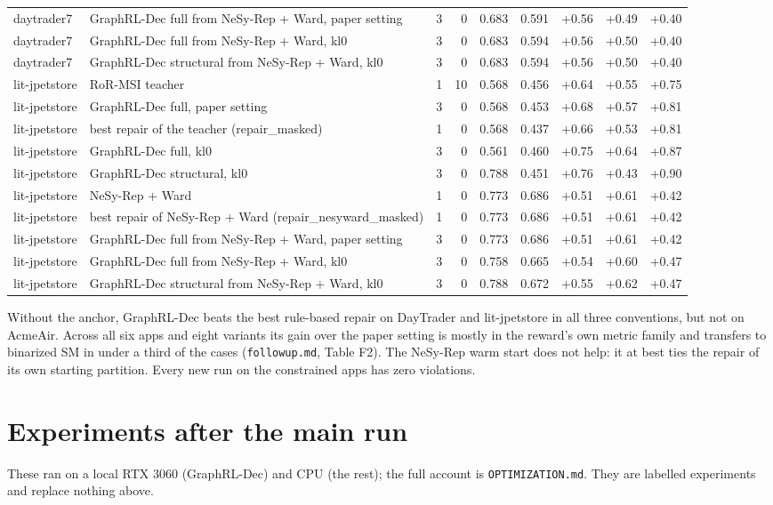 \documentclass[10pt,a4paper]{article}
\begin{document}
\begin{center}
{\begin{tabular}{llrrrrrrr}
daytrader7 & GraphRL-Dec full from NeSy-Rep + Ward, paper setting & 3 & 0 & 0.683 & 0.591 & +0.56 & +0.49 & +0.40 \\
daytrader7 & GraphRL-Dec full from NeSy-Rep + Ward, kl0 & 3 & 0 & 0.683 & 0.594 & +0.56 & +0.50 & +0.40 \\
daytrader7 & GraphRL-Dec structural from NeSy-Rep + Ward, kl0 & 3 & 0 & 0.683 & 0.594 & +0.56 & +0.50 & +0.40 \\
lit-jpetstore & RoR-MSI teacher & 1 & 10 & 0.568 & 0.456 & +0.64 & +0.55 & +0.75 \\
lit-jpetstore & GraphRL-Dec full, paper setting & 3 & 0 & 0.568 & 0.453 & +0.68 & +0.57 & +0.81 \\
lit-jpetstore & best repair of the teacher (repair\_masked) & 1 & 0 & 0.568 & 0.437 & +0.66 & +0.53 & +0.81 \\
lit-jpetstore & GraphRL-Dec full, kl0 & 3 & 0 & 0.561 & 0.460 & +0.75 & +0.64 & +0.87 \\
lit-jpetstore & GraphRL-Dec structural, kl0 & 3 & 0 & 0.788 & 0.451 & +0.76 & +0.43 & +0.90 \\
lit-jpetstore & NeSy-Rep + Ward & 1 & 0 & 0.773 & 0.686 & +0.51 & +0.61 & +0.42 \\
lit-jpetstore & best repair of NeSy-Rep + Ward (repair\_nesyward\_masked) & 1 & 0 & 0.773 & 0.686 & +0.51 & +0.61 & +0.42 \\
lit-jpetstore & GraphRL-Dec full from NeSy-Rep + Ward, paper setting & 3 & 0 & 0.773 & 0.686 & +0.51 & +0.61 & +0.42 \\
lit-jpetstore & GraphRL-Dec full from NeSy-Rep + Ward, kl0 & 3 & 0 & 0.758 & 0.665 & +0.54 & +0.60 & +0.47 \\
lit-jpetstore & GraphRL-Dec structural from NeSy-Rep + Ward, kl0 & 3 & 0 & 0.788 & 0.672 & +0.55 & +0.62 & +0.47 \\
\bottomrule
\end{tabular}}\end{center}
Without the anchor, GraphRL-Dec beats the best rule-based repair on DayTrader and lit-jpetstore in all three conventions, but not on AcmeAir. Across all six apps and eight variants its gain over the paper setting is mostly in the reward's own metric family and transfers to binarized SM in under a third of the cases (\texttt{followup.md}, Table F2). The NeSy-Rep warm start does not help: it at best ties the repair of its own starting partition. Every new run on the constrained apps has zero violations.
\section{Experiments after the main run}\label{sec:after}
These ran on a local RTX 3060 (GraphRL-Dec) and CPU (the rest); the full account is \texttt{OPTIMIZATION.md}. They are labelled experiments and replace nothing above.
\end{document}
